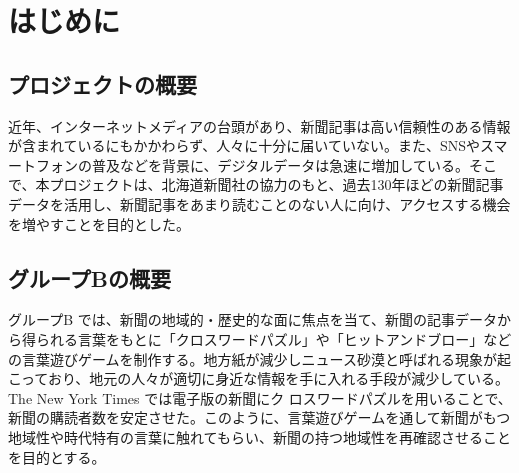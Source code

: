 \chapter{はじめに}

\section{プロジェクトの概要}
近年、インターネットメディアの台頭があり、新聞記事は高い信頼性のある情報が含まれているにもかかわらず、人々に十分に届いていない。また、SNSやスマートフォンの普及などを背景に、デジタルデータは急速に増加している。そこで、本プロジェクトは、北海道新聞社の協力のもと、過去130年ほどの新聞記事データを活用し、新聞記事をあまり読むことのない人に向け、アクセスする機会を増やすことを目的とした。

\section{グループBの概要}
グループB では、新聞の地域的・歴史的な面に焦点を当て、新聞の記事データから得られる言葉をもとに「クロスワードパズル」や「ヒットアンドブロー」などの言葉遊びゲームを制作する。地方紙が減少しニュース砂漠と呼ばれる現象が起こっており、地元の人々が適切に身近な情報を手に入れる手段が減少している。The New York Times では電子版の新聞にク
ロスワードパズルを用いることで、新聞の購読者数を安定させた。このように、言葉遊びゲームを通して新聞がもつ地域性や時代特有の言葉に触れてもらい、新聞の持つ地域性を再確認させることを目的とする。

